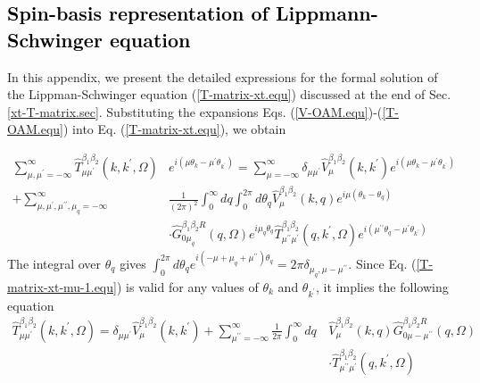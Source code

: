 \documentclass[aps,prb,superscriptaddress,letterpaper,amsmath,amssymb,twocolumn,preprintnumbers]{revtex4}
\newcommand\revisionB[1]{\textcolor{black}{#1}}
\begin{document}
\revisionB{
\section{Spin-basis representation  of Lippmann-Schwinger equation}
}

\label{app:Tmat-matrices}



In this appendix, we present the detailed expressions for the formal solution of the Lippman-Schwinger equation (\ref{T-matrix-xt.equ}) discussed at the
end of Sec. \ref{xt-T-matrix.sec}.
%
Substituting the expansions Eqs. (\ref{V-OAM.equ})-(\ref{T-OAM.equ}) into Eq. (\ref{T-matrix-xt.equ}), we obtain
\begin{widetext}
\begin{align}\label{T-matrix-xt-mu-1.equ}
\sum_{\mu , \mu^{\prime} = -\infty}^{\infty} \hat{T}^{\beta_1 \beta_2}_{\mu \mu^{\prime}} ( k,k^{\prime}, \Omega) &e^{i (\mu \theta_k - \mu^{\prime} \theta_{k^{\prime}})} = \sum_{\mu = -\infty}^{\infty} \delta_{\mu \mu^{\prime}} \hat{V}^{\beta_1 \beta_2}_{\mu} (k,k^{\prime}) e^{i (\mu \theta_k - \mu^{\prime} \theta_{k^{\prime}})} \\
+ \sum^{\infty}_{\mu, \mu^{\prime}, \mu^{\prime \prime}, \mu_q = -\infty} &\frac {1} {(2 \pi)^2} \int^{\infty}_{0} d q \int^{2 \pi}_{0} d \theta_q \hat{V}^{\beta_1 \beta_2}_{\mu} (k,q) e^{i \mu (\theta_k - \theta_q)}
\nonumber \\
&\cdot \hat{G}^{\beta_1 \beta_2 R}_{0 \mu_q} (q,\Omega) e^{i \mu_q \theta_q} \hat{T}^{\beta_1 \beta_2}_{\mu^{\prime \prime} \mu^{\prime}} (q,k^{\prime}, \Omega) e^{i (\mu^{\prime \prime} \theta_q - \mu^{\prime} \theta_{k^{\prime}})} \nonumber
\end{align}
The integral over $\theta_q$ gives $\int^{2 \pi}_0 d \theta_q e^{i (- \mu + \mu_q + \mu^{\prime \prime}) \theta_q} = 2 \pi \delta_{\mu_q , \mu - \mu^{\prime \prime}}$. Since Eq. (\ref{T-matrix-xt-mu-1.equ}) is valid for any values of $\theta_k$ and $\theta_{k^{\prime}}$, it implies the following equation
\begin{align}
\hat{T}^{\beta_1 \beta_2}_{\mu \mu^{\prime}} ( k,k^{\prime}, \Omega) = \delta_{\mu \mu^{\prime}} \hat{V}^{\beta_1 \beta_2}_{\mu} (k,k^{\prime})
+ \sum^{\infty}_{\mu^{\prime \prime} = -\infty} \frac {1} {2 \pi} \int^{\infty}_{0} d q \, &\hat{V}^{\beta_1 \beta_2}_{\mu} (k,q) \hat{G}^{\beta_1 \beta_2 R}_{0 \mu - \mu^{\prime \prime}} (q,\Omega) \nonumber \\
\label{T-matrix-xt-mu.equ}
&\cdot \hat{T}^{\beta_1 \beta_2}_{\mu^{\prime \prime} \mu^{\prime}} (q,k^{\prime}, \Omega)

\end{align}
\end{widetext}
\end{document}
